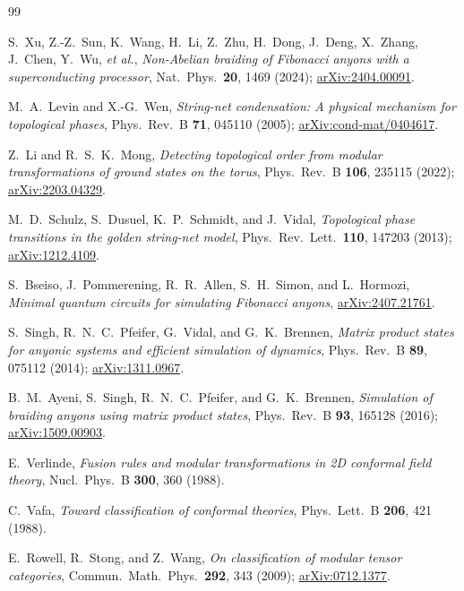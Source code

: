 \documentclass[aps,pra,twocolumn,superscriptaddress,longbibliography,floatfix,nofootinbib]{revtex4-2}
\begin{document}
\begin{thebibliography}{99}

S.~Xu, Z.-Z.~Sun, K.~Wang, H.~Li, Z.~Zhu, H.~Dong, J.~Deng, X.~Zhang, J.~Chen,
Y.~Wu, \emph{et al.},
\emph{Non-Abelian braiding of Fibonacci anyons with a superconducting
processor},
Nat.\ Phys.\ \textbf{20}, 1469 (2024);
\href{https://arxiv.org/abs/2404.00091}{arXiv:2404.00091}.

M.~A.~Levin and X.-G.~Wen,
\emph{String-net condensation: A physical mechanism for topological phases},
Phys.\ Rev.\ B \textbf{71}, 045110 (2005);
\href{https://arxiv.org/abs/cond-mat/0404617}{arXiv:cond-mat/0404617}.

Z.~Li and R.~S.~K.~Mong,
\emph{Detecting topological order from modular transformations of ground states
on the torus},
Phys.\ Rev.\ B \textbf{106}, 235115 (2022);
\href{https://arxiv.org/abs/2203.04329}{arXiv:2203.04329}.

M.~D.~Schulz, S.~Dusuel, K.~P.~Schmidt, and J.~Vidal,
\emph{Topological phase transitions in the golden string-net model},
Phys.\ Rev.\ Lett.\ \textbf{110}, 147203 (2013);
\href{https://arxiv.org/abs/1212.4109}{arXiv:1212.4109}.

S.~Bseiso, J.~Pommerening, R.~R.~Allen, S.~H.~Simon, and L.~Hormozi,
\emph{Minimal quantum circuits for simulating Fibonacci anyons},
\href{https://arxiv.org/abs/2407.21761}{arXiv:2407.21761}.

S.~Singh, R.~N.~C.~Pfeifer, G.~Vidal, and G.~K.~Brennen,
\emph{Matrix product states for anyonic systems and efficient simulation of
dynamics},
Phys.\ Rev.\ B \textbf{89}, 075112 (2014);
\href{https://arxiv.org/abs/1311.0967}{arXiv:1311.0967}.

B.~M.~Ayeni, S.~Singh, R.~N.~C.~Pfeifer, and G.~K.~Brennen,
\emph{Simulation of braiding anyons using matrix product states},
Phys.\ Rev.\ B \textbf{93}, 165128 (2016);
\href{https://arxiv.org/abs/1509.00903}{arXiv:1509.00903}.

E.~Verlinde,
\emph{Fusion rules and modular transformations in 2D conformal field theory},
Nucl.\ Phys.\ B \textbf{300}, 360 (1988).

C.~Vafa,
\emph{Toward classification of conformal theories},
Phys.\ Lett.\ B \textbf{206}, 421 (1988).

E.~Rowell, R.~Stong, and Z.~Wang,
\emph{On classification of modular tensor categories},
Commun.\ Math.\ Phys.\ \textbf{292}, 343 (2009);
\href{https://arxiv.org/abs/0712.1377}{arXiv:0712.1377}.


\end{thebibliography}
\end{document}
